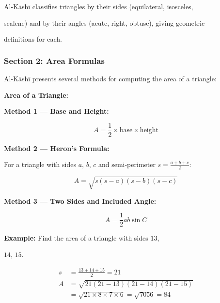 \documentclass[11pt,a4paper]{article}
\newenvironment{mathalgo}{%

  \par\vspace{0.3cm}

  \begin{framed}

  \setlength{\parindent}{0pt}

}{%

  \end{framed}

  \par\vspace{0.3cm}

}
\begin{document}
Al-K\=ash\=i classifies triangles by their sides (equilateral, isosceles,

scalene) and by their angles (acute, right, obtuse), giving geometric

definitions for each.



\subsubsection{Section 2: Area Formulas}



Al-K\=ash\=i presents several methods for computing the area of a triangle:



\begin{mathalgo}

\textbf{Area of a Triangle:}



\textbf{Method 1 --- Base and Height:}

\[

A = \frac{1}{2} \times \text{base} \times \text{height}

\]



\textbf{Method 2 --- Heron's Formula:}

For a triangle with sides $a$, $b$, $c$ and semi-perimeter $s =

\frac{a+b+c}{2}$:

\[

A = \sqrt{s(s-a)(s-b)(s-c)}

\]



\textbf{Method 3 --- Two Sides and Included Angle:}

\[

A = \frac{1}{2} ab \sin C

\]

\end{mathalgo}



\noindent\textbf{Example:} Find the area of a triangle with sides $13$,

$14$, $15$.



\begin{align*}

s &= \frac{13 + 14 + 15}{2} = 21 \\

A &= \sqrt{21(21-13)(21-14)(21-15)} \\

&= \sqrt{21 \times 8 \times 7 \times 6} = \sqrt{7056} = 84

\end{align*}
\end{document}
